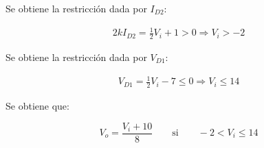Se obtiene la restricción dada por $I_{D2}$:

\begin{align*}
  2k I_{D2} = \frac{1}{2} V_i + 1 > 0
  \Rightarrow
  V_i > -2
\end{align*}

Se obtiene la restricción dada por $V_{D1}$:

\begin{align*}
  V_{D1} = \frac{1}{2} V_i - 7 \leq 0
  \Rightarrow
  V_i \leq 14
\end{align*}

Se obtiene que:

\begin{equation} \label{p3:offon}
  V_o = \frac{V_i + 10}{8}
  \quad
  \quad
  \mathrm{si}
  \quad
  \quad
  -2 < V_i \leq 14
\end{equation}
